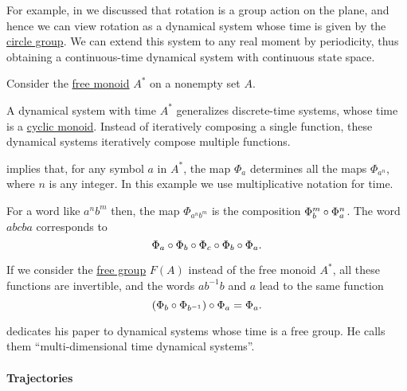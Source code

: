 \begin{example}
\begin{thmenum}
    For example, in  we discussed that rotation is a group action on the plane, and hence we can view rotation as a dynamical system whose time is given by the \hyperref[def:circle_group]{circle group}. We can extend this system to any real moment by periodicity, thus obtaining a continuous-time dynamical system with continuous state space.

     Consider the \hyperref[def:free_monoid]{free monoid} \( A^* \) on a nonempty set \( A \).

    A dynamical system with time \( A^* \) generalizes discrete-time systems, whose time is a \hyperref[def:cyclic_monoid]{cyclic monoid}. Instead of iteratively composing a single function, these dynamical systems iteratively compose multiple functions.

     implies that, for any symbol \( a \) in \( A^* \), the map \( \Phi_a \) determines all the maps \( \Phi_{a^n} \), where \( n \) is any integer. In this example we use multiplicative notation for time.

    For a word like \( a^n b^m \) then, the map \( \Phi_{a^n b^m} \) is the composition \( \Phi_b^m \bincirc \Phi_a^n \). The word \( abcba \) corresponds to
    \begin{equation*}
      \Phi_a \bincirc \Phi_b \bincirc \Phi_c \bincirc \Phi_b \bincirc \Phi_a.
    \end{equation*}

    If we consider the \hyperref[def:free_group]{free group} \( F(A) \) instead of the free monoid \( A^* \), all these functions are invertible, and the words \( ab^{-1}b \) and \( a \) lead to the same function
    \begin{equation*}
      (\Phi_b \bincirc \Phi_{b^{-1}}) \bincirc \Phi_a = \Phi_a.
    \end{equation*}

     dedicates his paper to dynamical systems whose time is a free group. He calls them \enquote{multi-dimensional time dynamical systems}.
  \end{thmenum}
\end{example}

\paragraph{Trajectories}


